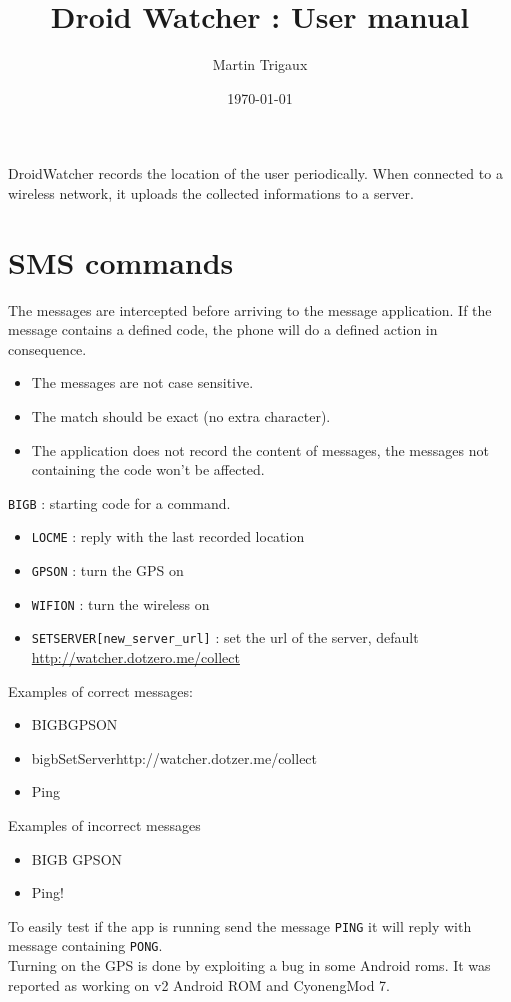 \documentclass{article}
\title{Droid Watcher : User manual}
\author{Martin Trigaux}
\date{\today}
\begin{document}
\maketitle

DroidWatcher records the location of the user periodically.
When connected to a wireless network, it uploads the collected informations to a server.

\section{SMS commands}

The messages are intercepted before arriving to the message application. If the message contains a defined code, the phone will do a defined action in consequence.

\begin{itemize}
\item The messages are not case sensitive.
\item The match should be exact (no extra character).
\item The application does not record the content of messages, the messages not containing the code won't be affected.
\end{itemize}

\vspace{0.5cm}
\texttt{BIGB} : starting code for a command.
\begin{itemize}
\item \texttt{LOCME} : reply with the last recorded location
\item \texttt{GPSON} : turn the GPS on
\item \texttt{WIFION} : turn the wireless on
\item \texttt{SETSERVER[new\_server\_url]} : set
  the url of the server, default
  \url{http://watcher.dotzero.me/collect}
\end{itemize}

\vspace{0.5cm}
Examples of correct messages:
\begin{itemize}
\item BIGBGPSON
\item bigbSetServerhttp://watcher.dotzer.me/collect
\item Ping
\end{itemize}

\vspace{0.5cm}
Examples of incorrect messages
\begin{itemize}
\item BIGB GPSON
\item Ping!
\end{itemize}
\vspace{0.5cm}
To easily test if the app is running send the message \texttt{PING} it will reply with message containing \texttt{PONG}.\\
Turning on the GPS is done by exploiting a bug in some Android roms. It was reported as working on v2 Android ROM and CyonengMod 7.
\end{document}
